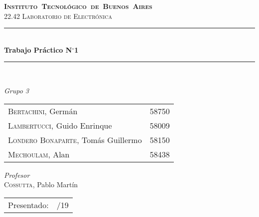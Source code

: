 \begin{titlepage}

\newcommand{\HRule}{\rule{\linewidth}{0.5mm}}
\center
\mbox{\textsc{\LARGE \bfseries {Instituto Tecnológico de Buenos Aires}}}\\[1.5cm]
\textsc{\Large 22.42 Laboratorio de Electrónica}\\[0.5cm]


\HRule \\[0.6cm]
{ \Huge \bfseries Trabajo Práctico N$^{\circ}$1}\\[0.4cm] 
\HRule \\[1.5cm]


{\large

\emph{Grupo 3}\\
\vspace{3px}

\begin{tabular}{lr} 	
\textsc{Bertachini}, Germán  & 58750 \\ 	
\textsc{Lambertucci}, Guido Enrinque  & 58009 \\
\textsc{Londero Bonaparte}, Tomás Guillermo  & 58150 \\
\textsc{Mechoulam}, Alan  &  58438\\
\end{tabular}

\vspace{20px}

\emph{Profesor}\\
\vspace{3px}
\textsc{Cossutta}, Pablo Martín\\	

\vspace{100px}

\begin{tabular}{ll}

Presentado: & /19\\

\end{tabular}

}

\vfill

\end{titlepage}

